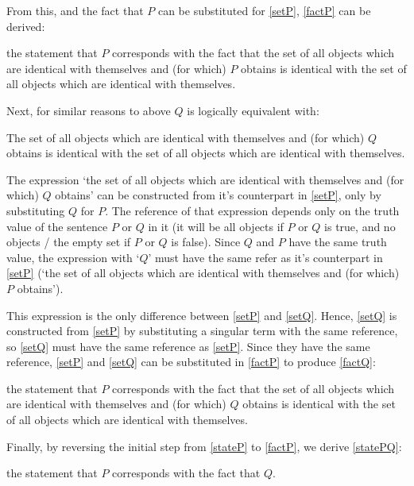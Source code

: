 From this, and the fact that $P$ can be substituted for \ref{setP}, \ref{factP} can be derived:

	\begin{example}\label{factP}
	the statement that $P$ corresponds with the fact that the set of all objects which are identical with themselves and (for which) $P$ obtains is identical with the set of all objects which are identical with themselves.
	\end{example}

Next, for similar reasons to above $Q$ is logically equivalent with:

	\begin{example}\label{setQ}
	The set of all objects which are identical with themselves and (for which) $Q$ obtains is identical with the set of all objects which are identical with themselves.
	\end{example}

The expression `the set of all objects which are identical with themselves and (for which) $Q$ obtains' can be constructed from it's counterpart in \ref{setP}, only by substituting $Q$ for $P$.
The reference of that expression depends only on the truth value of the sentence $P$ or $Q$ in it (it will be all objects if $P$ or $Q$ is true, and no objects / the empty set if $P$ or $Q$ is false).
Since $Q$ and $P$ have the same truth value, the expression with `$Q$' must have the same refer as it's counterpart in \ref{setP} (`the set of all objects which are identical with themselves and (for which) $P$ obtains').

This expression is the only difference between \ref{setP} and \ref{setQ}.
Hence, \ref{setQ} is constructed from \ref{setP} by substituting a singular term with the same reference, so \ref{setQ} must have the same reference as \ref{setP}.
Since they have the same reference, \ref{setP} and \ref{setQ} can be substituted in \ref{factP} to produce \ref{factQ}:

	\begin{example}\label{factQ}
	the statement that $P$ corresponds with the fact that the set of all objects which are identical with themselves and (for which) $Q$ obtains is identical with the set of all objects which are identical with themselves.
	\end{example}

Finally, by reversing the initial step from \ref{stateP} to \ref{factP}, we derive \ref{statePQ}:

	\begin{example}\label{statePQ}
	the statement that $P$ corresponds with the fact that $Q$.
	\end{example}

